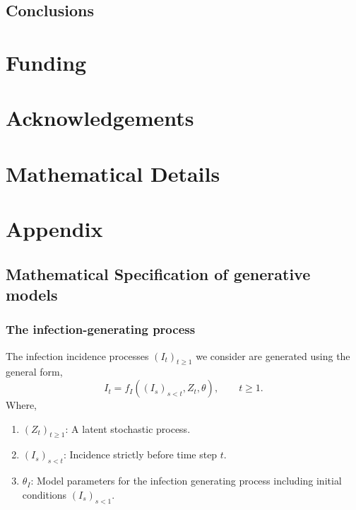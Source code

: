 \documentclass{getwriting}
\begin{document}
\subsection{Conclusions}

\newpage
\section*{Funding}

\section*{Acknowledgements}

\newpage

\newpage

\appendix
\section{Mathematical Details}

\section*{Appendix}
\subsection{Mathematical Specification of generative models}


\subsubsection{The infection-generating process}
The infection incidence processes $(I_t)_{t\geq 1}$ we consider are generated using the general form,
\begin{equation}
    I_t = f_I((I_s)_{s < t}, Z_t, \theta),\qquad t \geq 1.
\end{equation}
Where,
\begin{enumerate}
    \item $(Z_t)_{t\geq 1}$: A latent stochastic process.
    \item $(I_s)_{s < t}$: Incidence strictly before time step $t$.
    \item $\theta_I$: Model parameters for the infection generating process including initial conditions $(I_s)_{s<1}$.
\end{enumerate}
\end{document}
